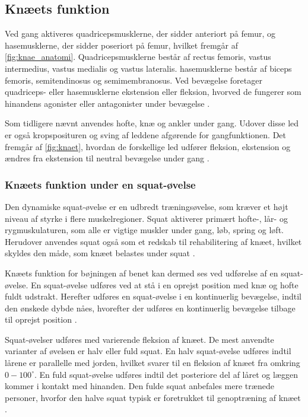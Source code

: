 \subsection{Knæets funktion}
Ved gang aktiveres quadricepsmusklerne, der sidder anteriort på femur, og hasemusklerne, der sidder poseriort på femur, hvilket fremgår af \autoref{fig:knae_anatomi}. Quadricepsmusklerne består af rectus femoris, vastus intermedius, vastus medialis og vastus lateralis. hasemusklerne består af biceps femoris, semitendinosus og semimembranosus. Ved bevægelse foretager quadriceps- eller hasemusklerne ekstension eller fleksion, hvorved de fungerer som hinandens agonister eller antagonister under bevægelse \citep{martini2012}. 

Som tidligere nævnt anvendes hofte, knæ og ankler under gang. Udover disse led er også kropsposituren og sving af leddene afgørende for gangfunktionen. Det fremgår af \autoref{fig:knaet}, hvordan de forskellige led udfører fleksion, ekstension og ændres fra ekstension til neutral bevægelse under gang \citep{martini2012}.

\subsubsection{Knæets funktion under en squat-øvelse}
Den dynamiske squat-øvelse er en udbredt træningsøvelse, som kræver et højt niveau af styrke i flere muskelregioner. Squat aktiverer primært hofte-, lår- og rygmuskulaturen, som alle er vigtige muskler under gang, løb, spring og løft. Herudover anvendes squat også som et redskab til rehabilitering af knæet, hvilket skyldes den måde, som knæet belastes under squat \citep{escamilla2001}. 

Knæets funktion for bøjningen af benet kan dermed ses ved udførelse af en squat-øvelse. En squat-øvelse udføres ved at stå i en oprejst position med knæ og hofte fuldt udstrakt. Herefter udføres en squat-øvelse i en kontinuerlig bevægelse, indtil den ønskede dybde nåes, hvorefter der udføres en kontinuerlig bevægelse tilbage til oprejst position \citep{escamilla2001}.

Squat-øvelser udføres med varierende fleksion af knæet. De mest anvendte varianter af øvelsen er halv eller fuld squat. En halv squat-øvelse udføres indtil lårene er parallelle med jorden, hvilket svarer til en fleksion af knæet fra omkring $0-100^{\circ}$. En fuld squat-øvelse udføres indtil det posteriore del af låret og læggen kommer i kontakt med hinanden. Den fulde squat anbefales mere trænede personer, hvorfor den halve squat typisk er foretrukket til genoptræning af knæet \citep{escamilla2001}.

